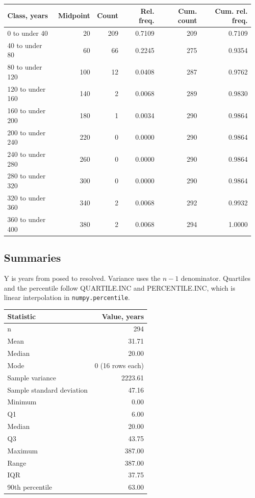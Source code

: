 \documentclass[11pt]{article}
\begin{document}
\begin{center}\begin{tabular}{lrrrrr}
\toprule
Class, years & Midpoint & Count & Rel. freq. & Cum. count & Cum. rel. freq. \\
\midrule
0 to under 40 & 20 & 209 & 0.7109 & 209 & 0.7109 \\
40 to under 80 & 60 & 66 & 0.2245 & 275 & 0.9354 \\
80 to under 120 & 100 & 12 & 0.0408 & 287 & 0.9762 \\
120 to under 160 & 140 & 2 & 0.0068 & 289 & 0.9830 \\
160 to under 200 & 180 & 1 & 0.0034 & 290 & 0.9864 \\
200 to under 240 & 220 & 0 & 0.0000 & 290 & 0.9864 \\
240 to under 280 & 260 & 0 & 0.0000 & 290 & 0.9864 \\
280 to under 320 & 300 & 0 & 0.0000 & 290 & 0.9864 \\
320 to under 360 & 340 & 2 & 0.0068 & 292 & 0.9932 \\
360 to under 400 & 380 & 2 & 0.0068 & 294 & 1.0000 \\
\bottomrule
\end{tabular}\end{center}

\subsection{Summaries}

Y is years from posed to resolved. Variance uses the $n - 1$ denominator. Quartiles and the percentile follow QUARTILE.INC and PERCENTILE.INC, which is linear interpolation in \texttt{numpy.percentile}.

\begin{center}\begin{tabular}{lr}
\toprule
Statistic & Value, years \\
\midrule
n & 294 \\
Mean & 31.71 \\
Median & 20.00 \\
Mode & 0 (16 rows each) \\
Sample variance & 2223.61 \\
Sample standard deviation & 47.16 \\
Minimum & 0.00 \\
Q1 & 6.00 \\
Median & 20.00 \\
Q3 & 43.75 \\
Maximum & 387.00 \\
Range & 387.00 \\
IQR & 37.75 \\
90th percentile & 63.00 \\
\bottomrule
\end{tabular}\end{center}
\end{document}
